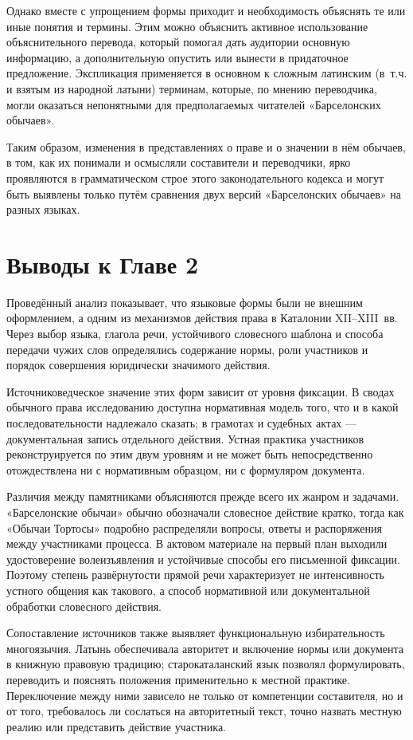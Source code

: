 Однако вместе с упрощением формы приходит и необходимость объяснять те или иные понятия и термины. Этим можно объяснить активное использование объяснительного перевода, который помогал дать аудитории основную информацию, а дополнительную опустить или вынести в придаточное предложение. Экспликация применяется в основном к сложным латинским (в~т.ч. и взятым из народной латыни) терминам, которые, по мнению переводчика, могли оказаться непонятными для предполагаемых читателей «Барселонских обычаев».

Таким образом, изменения в представлениях о праве и о значении в нём обычаев, в том, как их понимали и осмысляли составители и переводчики, ярко проявляются в грамматическом строе этого законодательного кодекса и могут быть выявлены только путём сравнения двух версий «Барселонских обычаев» на разных языках.

\section*{Выводы к Главе 2}

Проведённый анализ показывает, что языковые формы были не внешним оформлением, а одним из механизмов действия права в Каталонии XII--XIII~вв. Через выбор языка, глагола речи, устойчивого словесного шаблона и способа передачи чужих слов определялись содержание нормы, роли участников и порядок совершения юридически значимого действия.

Источниковедческое значение этих форм зависит от уровня фиксации. В сводах обычного права исследованию доступна нормативная модель того, что и в какой последовательности надлежало сказать; в грамотах и судебных актах --- документальная запись отдельного действия. Устная практика участников реконструируется по этим двум уровням и не может быть непосредственно отождествлена ни с нормативным образцом, ни с формуляром документа.

Различия между памятниками объясняются прежде всего их жанром и задачами. «Барселонские обычаи» обычно обозначали словесное действие кратко, тогда как «Обычаи Тортосы» подробно распределяли вопросы, ответы и распоряжения между участниками процесса. В актовом материале на первый план выходили удостоверение волеизъявления и устойчивые способы его письменной фиксации. Поэтому степень развёрнутости прямой речи характеризует не интенсивность устного общения как такового, а способ нормативной или документальной обработки словесного действия.

Сопоставление источников также выявляет функциональную избирательность многоязычия. Латынь обеспечивала авторитет и включение нормы или документа в книжную правовую традицию; старокаталанский язык позволял формулировать, переводить и пояснять положения применительно к местной практике. Переключение между ними зависело не только от компетенции составителя, но и от того, требовалось ли сослаться на авторитетный текст, точно назвать местную реалию или представить действие участника.

